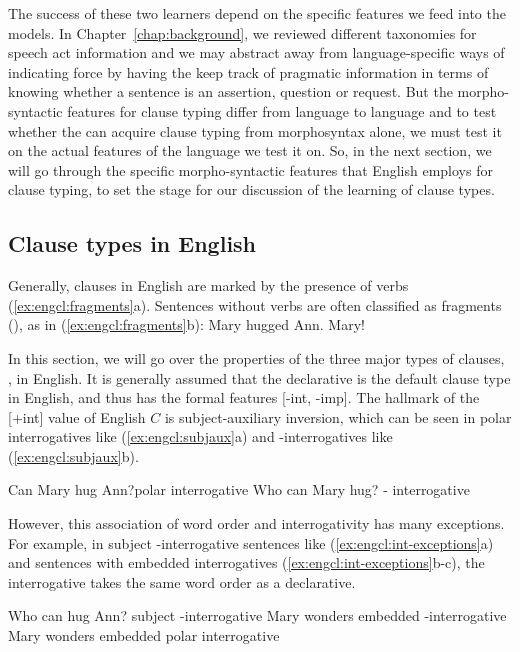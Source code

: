 The success of these two learners depend on the specific features we feed into the models. In Chapter~\ref{chap:background}, we reviewed different taxonomies for speech act information and we may abstract away from language-specific ways of indicating force by having the \plearnerabbr{} keep track of pragmatic information in terms of knowing whether a sentence is an assertion, question or request. But the morpho-syntactic features for clause typing differ from language to language and to test whether the \dlearnerabbr{} can acquire clause typing from morphosyntax alone, we must test it on the actual features of the language we test it on. So, in the next section, we will go through the specific morpho-syntactic features that English employs for clause typing, to set the stage for our discussion of the learning of clause types. 


\subsection{Clause types in English} \label{sec:engcl:bg:grammar}

Generally, clauses in English are marked by the presence of verbs (\ref{ex:engcl:fragments}a). Sentences without verbs are often classified as fragments (\cite{sz1985speechact}), as in (\ref{ex:engcl:fragments}b):
\bxl{}
Mary hugged Ann.
\ex
Mary!
\exl
\eex

In this section, we will go over the properties of the three major types of clauses, \diis{}, in English. 
It is generally assumed that the declarative is the default clause type in English, and thus has the formal features [-int, -imp]. The hallmark of the [+int] value of English $C$ is subject-auxiliary inversion, which can be seen in polar interrogatives like  (\ref{ex:engcl:subjaux}a) and \twh-interrogatives like (\ref{ex:engcl:subjaux}b). 

\bxl{}
Can Mary hug Ann?\hfill polar interrogative
\ex
Who can Mary hug? \hfill \twh-
interrogative
\exl
\eex


However, this association of word order and interrogativity has many exceptions. For example, in subject \twh-interrogative sentences like (\ref{ex:engcl:int-exceptions}a) and sentences with embedded interrogatives (\ref{ex:engcl:int-exceptions}b-c), the interrogative takes the same word order as a declarative. 

\bxl{}
Who can hug Ann? \hfill subject \twh-interrogative
\ex
Mary wonders  \hfill embedded \twh-interrogative
\ex 
Mary wonders  \hfill embedded polar interrogative
\exl
\eex

